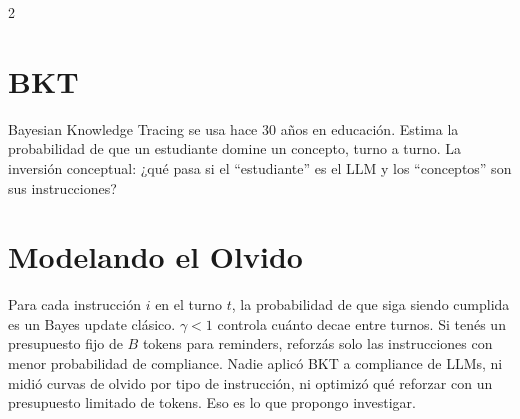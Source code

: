 \documentclass[10pt]{article}
\begin{document}
\begin{multicols}{2}
\section{BKT}
Bayesian Knowledge Tracing se usa hace 30 a\~nos en educaci\'on. Estima la probabilidad de que un estudiante domine un concepto, turno a turno. La inversi\'on conceptual: ¿qu\'e pasa si el ``estudiante'' es el LLM y los ``conceptos'' son sus instrucciones?

\section{Modelando el Olvido}
Para cada instrucci\'on $i$ en el turno $t$, la probabilidad de que siga siendo cumplida es un Bayes update cl\'asico. $\gamma < 1$ controla cu\'anto decae entre turnos. Si ten\'es un presupuesto fijo de $B$ tokens para reminders, reforz\'as solo las instrucciones con menor probabilidad de compliance. Nadie aplic\'o BKT a compliance de LLMs, ni midi\'o curvas de olvido por tipo de instrucci\'on, ni optimiz\'o qu\'e reforzar con un presupuesto limitado de tokens. Eso es lo que propongo investigar.

\end{multicols}
\end{document}
